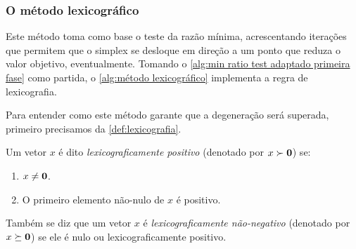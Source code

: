 \subsubsection{O método lexicográfico}
Este método toma como base o teste da razão mínima, acrescentando iterações que permitem que o simplex se desloque em direção a um ponto que reduza o valor objetivo, eventualmente. Tomando o \cref{alg:min ratio test adaptado primeira fase} como partida, o \cref{alg:método lexicográfico} implementa a regra de lexicografia.
\begin{algorithm}
\end{algorithm}

Para entender como este método garante que a degeneração será superada, primeiro precisamos da \cref{def:lexicografia}.

\begin{mydef}\label{def:lexicografia}
    Um vetor $ x$ é dito \emph{lexicograficamente positivo} (denotado por $ x \succ \vb 0$) se:
    \begin{enumerate}
        \item $ x \neq \vb 0$.
        \item O primeiro elemento não-nulo de $ x$ é positivo.
    \end{enumerate}
    Também se diz que um vetor $ x$ é \emph{lexicograficamente não-negativo} (denotado por $ x \succeq \vb 0$) se ele é nulo ou lexicograficamente positivo.
\end{mydef}

